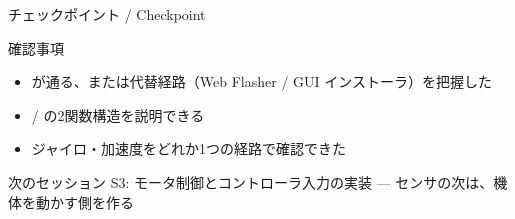 \begin{frame}{チェックポイント / Checkpoint}
  \begin{alertblock}{確認事項}
    \begin{itemize}
      \item[$\square$]  が通る、または代替経路（Web Flasher / GUI インストーラ）を把握した
      \item[$\square$] / の2関数構造を説明できる
      \item[$\square$] ジャイロ・加速度をどれか1つの経路で確認できた
    \end{itemize}
  \end{alertblock}

  \vspace{1em}

  \begin{block}{次のセッション}
    S3: モータ制御とコントローラ入力の実装 --- センサの次は、機体を動かす側を作る
  \end{block}
\end{frame}
